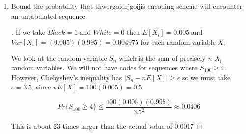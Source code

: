 \documentclass[]{book}
\theoremstyle{definition}
\begin{document}
\begin{enumerate}
\begin{proof}[\unskip\nopunct]










\end{proof}

\item	Bound the probability that thworgoidrjgoijis encoding scheme will encounter an untabulated sequence.

\begin{proof}[\unskip\nopunct]
		
If we take $Black = 1$ and $White = 0$ then $E[X_{i}] = 0.005$ and $Var[X_{i}] = (0.005)(0.995) = 0.004975$ for each random variable $X_{i}$

We look at the random variable $S_{n}$ which is the sum of precisely $n$  $X_{i}$ random variables. We will not have codes for sequences where $S_{100} \geq 4$. However, Chebyshev's inequality has $|S_{n} - nE[X]| \geq \epsilon$ so we must take $\epsilon = 3.5$, since $nE[X] = 100(0.005) = 0.5$

$$Pr\{S_{100} \geq 4\} \leq \dfrac{100(0.005)(0.995)}{3.5^{2}} \approx 0.0406$$

This is about 23 times larger than the actual value of 0.0017

\end{proof}

\end{enumerate}
\end{document}
